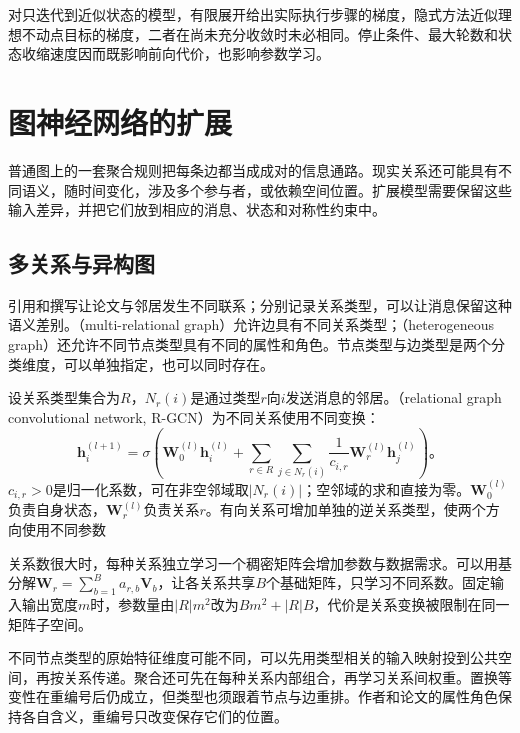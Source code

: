 对只迭代到近似状态的模型，有限展开给出实际执行步骤的梯度，隐式方法近似理想不动点目标的梯度，二者在尚未充分收敛时未必相同。停止条件、最大轮数和状态收缩速度因而既影响前向代价，也影响参数学习。

\section{图神经网络的扩展}
\label{sec:gnn-extensions}

普通图上的一套聚合规则把每条边都当成成对的信息通路。现实关系还可能具有不同语义，随时间变化，涉及多个参与者，或依赖空间位置。扩展模型需要保留这些输入差异，并把它们放到相应的消息、状态和对称性约束中。

\subsection{多关系与异构图}
\label{sec:gnn-relational}

引用和撰写让论文与邻居发生不同联系；分别记录关系类型，可以让消息保留这种语义差别。（multi-relational graph）允许边具有不同关系类型；（heterogeneous graph）还允许不同节点类型具有不同的属性和角色。节点类型与边类型是两个分类维度，可以单独指定，也可以同时存在。

设关系类型集合为$R$，$N_r(i)$是通过类型$r$向$i$发送消息的邻居。（relational graph convolutional network, R-GCN）为不同关系使用不同变换：
\begin{equation}
  \bm{h}_i^{(l+1)}=\sigma\!\left(
    \bm{W}_0^{(l)}\bm{h}_i^{(l)}+
    \sum_{r\in R}\sum_{j\in N_r(i)}
      \frac{1}{c_{i,r}}\bm{W}_r^{(l)}\bm{h}_j^{(l)}\right)\text{。}
  \label{eq:gnn-rgcn}
\end{equation}
$c_{i,r}>0$是归一化系数，可在非空邻域取$|N_r(i)|$；空邻域的求和直接为零。$\bm{W}_0^{(l)}$负责自身状态，$\bm{W}_r^{(l)}$负责关系$r$。有向关系可增加单独的逆关系类型，使两个方向使用不同参数

关系数很大时，每种关系独立学习一个稠密矩阵会增加参数与数据需求。可以用基分解$\bm{W}_r=\sum_{b=1}^{B}a_{r,b}\bm{V}_b$，让各关系共享$B$个基础矩阵，只学习不同系数。固定输入输出宽度$m$时，参数量由$|R|m^2$改为$Bm^2+|R|B$，代价是关系变换被限制在同一矩阵子空间。

不同节点类型的原始特征维度可能不同，可以先用类型相关的输入映射投到公共空间，再按关系传递。聚合还可先在每种关系内部组合，再学习关系间权重。置换等变性在重编号后仍成立，但类型也须跟着节点与边重排。作者和论文的属性角色保持各自含义，重编号只改变保存它们的位置。

